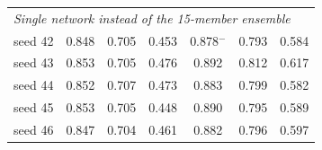 \begin{tabular}{lcccccc}
\multicolumn{7}{l}{\textit{Single network instead of the 15-member ensemble}} \\
\quad seed 42 & 0.848 & 0.705 & 0.453 & 0.878$^{-}$ & 0.793 & 0.584 \\
\quad seed 43 & 0.853 & 0.705 & 0.476 & 0.892 & 0.812 & 0.617 \\
\quad seed 44 & 0.852 & 0.707 & 0.473 & 0.883 & 0.799 & 0.582 \\
\quad seed 45 & 0.853 & 0.705 & 0.448 & 0.890 & 0.795 & 0.589 \\
\quad seed 46 & 0.847 & 0.704 & 0.461 & 0.882 & 0.796 & 0.597 \\
\bottomrule
\end{tabular}

